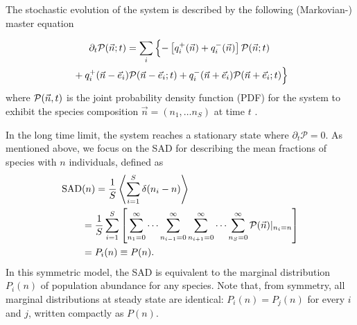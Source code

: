 \documentclass[9pt,twocolumn,twoside,lineno]{pnas-new}
\begin{document}
The stochastic evolution of the system is described by the following (Markovian-) master equation
\iffalse
\begin{multline}
\label{master-eq}
\partial_t  {\rm \mathcal{P}}(\vec{n};t)= \sum_{i}\left\{ \vphantom{\left[ q^+_i\right]} q^+_i (\vec{n}-\vec{e}_i){\rm \mathcal{P}}(\vec{n}-\vec{e}_i;t) \right.\\
+q^-_i (\vec{n}+\vec{e}_i){\rm \mathcal{P}}(\vec{n}+\vec{e}_i;t)\\ 
-\left. \left[q^+_i(\vec{n})+q^-_i(\vec{n})\right]{\rm \mathcal{P}}(\vec{n};t)
\right\}
\end{multline}
\fi
\begin{multline}
\label{master-eq}
\partial_t  {\rm \mathcal{P}}(\vec{n};t)= \sum_{i}\left\{ -\left[q^+_i(\vec{n})+q^-_i(\vec{n})\right]{\rm \mathcal{P}}(\vec{n};t) \vphantom{\left[ \sum q^+_i\right]} \right.\\
\left. \vphantom{\left[ \sum q^+_i\right]} +q^+_i (\vec{n}-\vec{e}_i){\rm \mathcal{P}}(\vec{n}-\vec{e}_i;t)+q^-_i (\vec{n}+\vec{e}_i){\rm \mathcal{P}}(\vec{n}+\vec{e}_i;t)\right\}
\end{multline}
where ${\rm \mathcal{P}}(\vec{n},t)$ is the joint probability density function (PDF) for the system to exhibit the species composition $\vec{n}=(n_1,\dots n_S)$ at time $t$ \cite{gardiner1985handbook}.

In the long time limit, the system reaches a stationary state where $\partial_t \mathcal{P}=0$. As mentioned above, we focus on the SAD for describing the mean fractions of species with $n$ individuals, defined as
\begin{align}
    {\rm SAD}&(n) = \frac{1}{S}\left\langle \sum_{i=1}^{S}\delta (n_i -n) \right\rangle\\
   \nonumber &=\frac{1}{S}\sum_{i=1}^S\left[ \sum_{n_1=0}^{\infty}\cdots \sum_{n_{i-1}=0}^{\infty}\sum_{n_{i+1}=0}^{\infty}\cdots \sum_{n_S=0}^{\infty}{\rm \mathcal{P}}(\vec{n})|_{n_i=n}\right] \\  &=\nonumber  P_i(n) \equiv  P(n) .
\end{align}
In this symmetric model, the SAD is equivalent to the marginal distribution $P_i(n)$ of population abundance  for any species. 
Note that, from symmetry, all marginal distributions at steady state are identical:  $P_i(n)=P_j(n)$ for every $i$ and $j$, written compactly as $P(n)$. 
\end{document}
